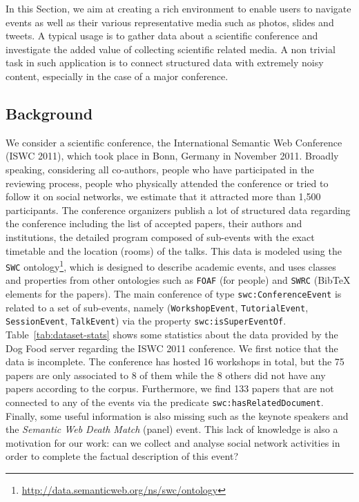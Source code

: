 In this Section, we aim at creating a rich environment to enable users to navigate events as well as their various representative media such as photos, slides and tweets. A typical usage is to gather data about a scientific conference and investigate the added value of collecting scientific related media. A non trivial task in such application is to connect structured data with extremely noisy content, especially in the case of a major conference.

\subsection{Background}

 We consider a scientific conference, the International Semantic Web Conference (ISWC 2011), which took place in Bonn, Germany in November 2011. Broadly speaking, considering all co-authors, people who have participated in the reviewing process, people who physically attended the conference or tried to follow it on social networks, we estimate that it attracted more than 1,500 participants. The conference organizers publish a lot of structured data regarding the conference including the list of accepted papers, their authors and institutions, the detailed program composed of sub-events with the exact timetable and the location (rooms) of the talks. This data is modeled using the \texttt{SWC} ontology\footnote{\url{http://data.semanticweb.org/ns/swc/ontology}}, which is designed to describe academic events, and uses classes and properties from other ontologies such as \texttt{FOAF} (for people) and \texttt{SWRC} (BibTeX elements for the papers). The main conference of type \texttt{swc:ConferenceEvent} is related to a set of sub-events, namely (\texttt{WorkshopEvent}, \texttt{TutorialEvent}, \texttt{SessionEvent}, \texttt{TalkEvent}) via the property \texttt{swc:isSuperEventOf}. Table~\ref{tab:dataset-stats} shows some statistics about the data provided by the Dog Food server regarding the ISWC 2011 conference. We first notice that the data is incomplete. The conference has hosted 16 workshops in total, but the 75 papers are only associated to 8 of them while the 8 others did not have any papers according to the corpus. Furthermore, we find 133 papers that are not connected to any of the events via the predicate \texttt{swc:hasRelatedDocument}. Finally, some useful information is also missing such as the keynote speakers and the \emph{Semantic Web Death Match} (panel) event. This lack of knowledge is also a motivation for our work: can we collect and analyse social network activities in order to complete the factual description of this event?

